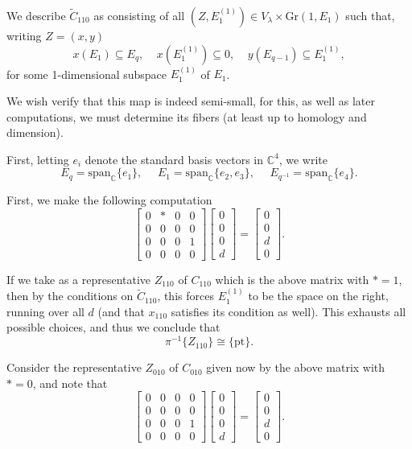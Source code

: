 \documentclass{memoir}
\newcommand{\bc}{\mathbb{C}}
\newcommand{\tx}{\text}
\theoremstyle{definition}
\begin{document}
	We describe $\tilde{C}_{110}$ as consisting of all $(Z, E_1^{(1)})\in V_\lambda\times \tx{Gr}(1, E_1)$ such that, writing $Z=(x, y)$ 
	$$x(E_1)\subseteq E_q, \ \ \ \ \ x(E_1^{(1)})\subseteq 0, \ \ \ \ \ y(E_{q-1})\subseteq E_1^{(1)},$$
	for some 1-dimensional subspace $E_1^{(1)}$ of $E_1$.  
	
	We wish verify that this map is indeed semi-small, for this, as well as later computations, we must determine its fibers (at least up to homology and dimension).  
	  
	First, letting $e_i$ denote the standard basis vectors in $\bc^4$, we write
	$$E_q=\tx{span}_\bc\{e_1\}, \ \ \ \ \ \ E_1=\tx{span}_{\bc}\{e_2, e_3\}, \ \ \ \ \ \ E_{q^{-1}}=\tx{span}_{\bc}\{e_4\}.$$
	
	First, we make the following computation
	$$\begin{bmatrix}
		0 & \ast & 0 & 0 \\
		0 & 0 & 0 & 0 \\
		0 & 0 & 0 & 1\\
		0 & 0 & 0 & 0
	\end{bmatrix}\begin{bmatrix}
	0  \\
	0 \\
	0 \\
	d
\end{bmatrix}=\begin{bmatrix}
 0 \\
 0 \\
 d \\
 0
\end{bmatrix}.
$$
	
	If we take as a representative $Z_{110}$ of $C_{110}$ which is the above matrix with $\ast=1$, then by the conditions on $\tilde{C}_{110}$, this forces $E_1^{(1)}$ to be the space on the right, running over all $d$ (and that $x_{110}$ satisfies its condition as well).  
	This exhausts all possible choices, and thus we conclude that 
	$$\pi^{-1}\{Z_{110}\}\cong\{\tx{pt}\}.$$
	
	Consider the representative $Z_{010}$ of $C_{010}$ given now by the above matrix with $\ast=0$, and note that
	$$\begin{bmatrix}
		0 & 0 & 0 & 0 \\
		0 & 0 & 0 & 0 \\
		0 & 0 & 0 & 1\\
		0 & 0 & 0 & 0
	\end{bmatrix}\begin{bmatrix}
	0\\
	0\\
	0\\
	d
\end{bmatrix}=\begin{bmatrix}
0 \\
0 \\
d \\
0
\end{bmatrix}.$$
	
\end{document}
